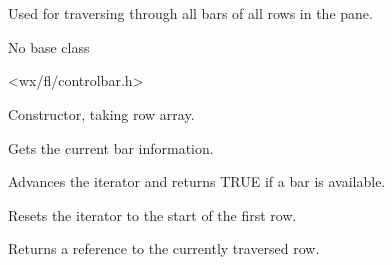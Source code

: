 %
%


\section{}\label{wxbariterator}


Used for traversing through all bars of all rows in the pane.


No base class


<wx/fl/controlbar.h>




\label{wxbariteratorwxbariterator}


Constructor, taking row array.


\label{wxbariteratorbarinfo}


Gets the current bar information.


\label{wxbariteratornext}


Advances the iterator and returns TRUE if a bar is available.


\label{wxbariteratorreset}


Resets the iterator to the start of the first row.


\label{wxbariteratorrowinfo}


Returns a reference to the currently traversed row.

